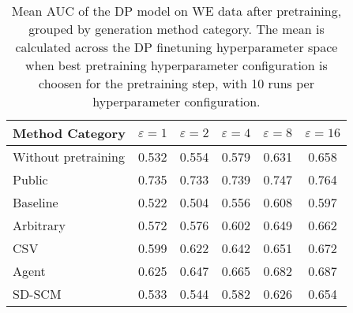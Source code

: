 \begin{table}[h!]
    \centering
    \caption{Mean AUC of the DP model on WE data after pretraining, grouped by generation method category. The mean is calculated across the DP finetuning hyperparameter space when best pretraining hyperparameter configuration is choosen for the pretraining step, with 10 runs per hyperparameter configuration.}
    \label{tab:epsilon_comparison}
    \begin{tabular}{lccccc}
    \toprule
    Method Category & $\varepsilon=1$ & $\varepsilon=2$ & $\varepsilon=4$ & $\varepsilon=8$ & $\varepsilon=16$ \\
    \midrule
    Without pretraining & 0.532 & 0.554 & 0.579 & 0.631 & 0.658 \\
    \arrayrulecolor{black!50!}\midrule
    Public & \cellcolor{gold!30}0.735 & \cellcolor{gold!30}0.733 & \cellcolor{gold!30}0.739 & \cellcolor{gold!30}0.747 & \cellcolor{gold!30}0.764 \\
    \arrayrulecolor{black!50!}\midrule
    Baseline & 0.522 & 0.504 & 0.556 & 0.608 & 0.597 \\
    \arrayrulecolor{black!50!}\midrule
    Arbitrary & 0.572 & 0.576 & 0.602 & 0.649 & 0.662 \\
    \arrayrulecolor{black!50!}\midrule
    CSV & \cellcolor{bronze!30}0.599 & \cellcolor{bronze!30}0.622 & \cellcolor{bronze!30}0.642 & \cellcolor{bronze!30}0.651 & \cellcolor{bronze!30}0.672 \\
    Agent & \cellcolor{silver!30}0.625 & \cellcolor{silver!30}0.647 & \cellcolor{silver!30}0.665 & \cellcolor{silver!30}0.682 & \cellcolor{silver!30}0.687 \\
    SD-SCM & 0.533 & 0.544 & 0.582 & 0.626 & 0.654 \\
    \bottomrule
    \end{tabular}
\end{table}